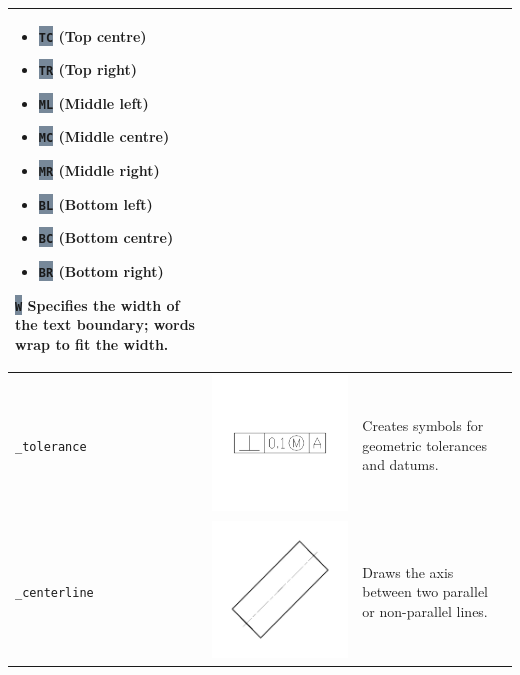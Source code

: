 \documentclass[..]{../IEEEphot}
\newcommand{\param}[1]{\colorbox{LightSlateGray}{\color{Navy}\texttt{\textbf{#1}}}}
\begin{document}
\begin{center}
\begin{longtable}{m{.2\linewidth}m{.2\linewidth}m{.25\linewidth}m{.25\linewidth}}
\begin{itemize}
\item \param{TC} (Top centre)
\item \param{TR} (Top right)
\item \param{ML} (Middle left)
\item \param{MC} (Middle centre)
\item \param{MR} (Middle right)
\item \param{BL} (Bottom left)
\item \param{BC} (Bottom centre)
\item \param{BR} (Bottom right)
\end{itemize}
\item \param{W} Specifies the width of the text boundary; words wrap to fit the width.
\\
\midrule
\texttt{\_tolerance} & \includegraphics[width = 0.8\linewidth, keepaspectratio]{../images/jpg/_tolerance.jpg} & Creates symbols for geometric tolerances and datums. \\
\midrule
\texttt{\_centerline} & \includegraphics[width = 0.8\linewidth, keepaspectratio]{../images/jpg/_centerline.jpg} & Draws the axis between two parallel or non-parallel lines. & 

\end{longtable}
\end{center}
\end{document}
